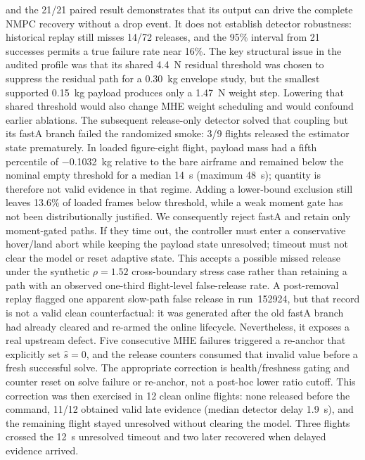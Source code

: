 \iffalse
and the 21/21 paired result demonstrates that its output can drive the complete NMPC recovery
without a drop event. It does not establish detector robustness: historical replay still misses
14/72 releases, and the 95\% interval from 21 successes permits a true failure rate near
16\%. The key structural issue in the audited profile was that its shared \SI{4.4}{N} residual
threshold was chosen to suppress the residual path for a \SI{0.30}{kg} envelope study, but the smallest supported
\SI{0.15}{kg} payload produces only a \SI{1.47}{N} weight step. Lowering that shared threshold
would also change MHE weight scheduling and would confound earlier ablations. The subsequent
release-only detector solved that coupling but its fastA branch failed the randomized smoke:
3/9 flights released the estimator state prematurely. In loaded figure-eight flight, payload
mass had a fifth percentile of \SI{-0.1032}{kg} relative to the bare airframe and remained below
the nominal empty threshold for a median \SI{14}{s} (maximum \SI{48}{s}); quantity is therefore
not valid evidence in that regime. Adding a lower-bound exclusion still leaves 13.6\% of loaded
frames below threshold, while a weak moment gate has not been distributionally justified.
We consequently reject fastA and retain only moment-gated paths. If they time out, the controller
must enter a conservative hover/land abort while keeping the payload state unresolved; timeout
must not clear the model or reset adaptive state. This accepts a possible missed release under
the synthetic $\rho=1.52$ cross-boundary stress case rather than retaining a path with an
observed one-third flight-level false-release rate. A post-removal replay flagged one apparent
slow-path false release in run~152924, but that record is not a valid clean counterfactual: it was
generated after the old fastA branch had already cleared and re-armed the online lifecycle.
Nevertheless, it exposes a real upstream defect. Five consecutive MHE failures triggered a
re-anchor that explicitly set $\hat s=0$, and the release counters consumed that invalid value
before a fresh successful solve. The appropriate correction is health/freshness gating and
counter reset on solve failure or re-anchor, not a post-hoc lower ratio cutoff. This correction
was then exercised in 12 clean online flights: none released before the command, 11/12 obtained
valid late evidence (median detector delay \SI{1.9}{s}), and the remaining flight stayed unresolved
without clearing the model. Three flights crossed the \SI{12}{s} unresolved timeout and two later
recovered when delayed evidence arrived.

